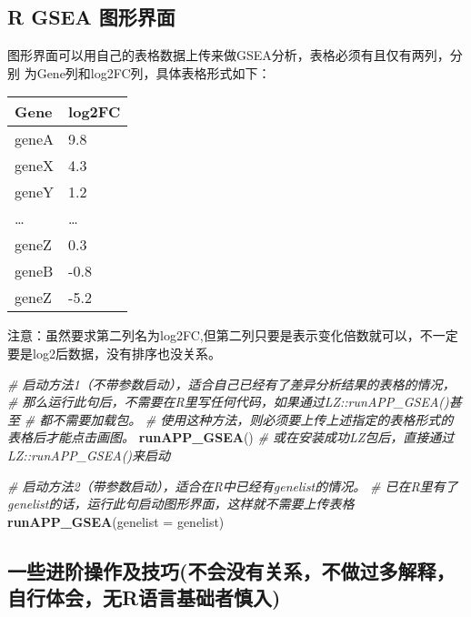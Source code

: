 \documentclass[
]{book}
\newenvironment{Shaded}{\begin{snugshade}}{\end{snugshade}}
\newcommand{\AttributeTok}[1]{\textcolor[rgb]{0.13,0.29,0.53}{#1}}
\newcommand{\CommentTok}[1]{\textcolor[rgb]{0.56,0.35,0.01}{\textit{#1}}}
\newcommand{\FunctionTok}[1]{\textcolor[rgb]{0.13,0.29,0.53}{\textbf{#1}}}
\newcommand{\NormalTok}[1]{#1}
\begin{document}
\subsection{R GSEA 图形界面}\label{enrich-gsea-r.gsea.gui}

图形界面可以用自己的表格数据上传来做GSEA分析，表格必须有且仅有两列，分别
为Gene列和log2FC列，具体表格形式如下：

\begin{longtable}[]{@{}ll@{}}
\toprule\noalign{}
Gene & log2FC \\
\midrule\noalign{}
\endhead
\bottomrule\noalign{}
\endlastfoot
geneA & 9.8 \\
geneX & 4.3 \\
geneY & 1.2 \\
\ldots{} & \ldots{} \\
geneZ & 0.3 \\
geneB & -0.8 \\
geneZ & -5.2 \\
\end{longtable}

注意：虽然要求第二列名为log2FC,但第二列只要是表示变化倍数就可以，不一定要是log2后数据，没有排序也没关系。

\begin{Shaded}
\begin{Highlighting}[]
\CommentTok{\# 启动方法1（不带参数启动），适合自己已经有了差异分析结果的表格的情况，}
\CommentTok{\#  那么运行此句后，不需要在R里写任何代码，如果通过LZ::runAPP\_GSEA()甚至}
\CommentTok{\#  都不需要加载包。}
\CommentTok{\#  使用这种方法，则必须要上传上述指定的表格形式的表格后才能点击画图。}
\FunctionTok{runAPP\_GSEA}\NormalTok{() }\CommentTok{\# 或在安装成功LZ包后，直接通过LZ::runAPP\_GSEA()来启动}

\CommentTok{\# 启动方法2（带参数启动），适合在R中已经有genelist的情况。}
\CommentTok{\# 已在R里有了genelist的话，运行此句启动图形界面，这样就不需要上传表格}
\FunctionTok{runAPP\_GSEA}\NormalTok{(}\AttributeTok{genelist =}\NormalTok{ genelist)}
\end{Highlighting}
\end{Shaded}

\subsection{一些进阶操作及技巧(不会没有关系，不做过多解释，自行体会，无R语言基础者慎入)}\label{ux4e00ux4e9bux8fdbux9636ux64cdux4f5cux53caux6280ux5de7ux4e0dux4f1aux6ca1ux6709ux5173ux7cfbux4e0dux505aux8fc7ux591aux89e3ux91caux81eaux884cux4f53ux4f1aux65e0rux8bedux8a00ux57faux7840ux8005ux614eux5165}
\end{document}
